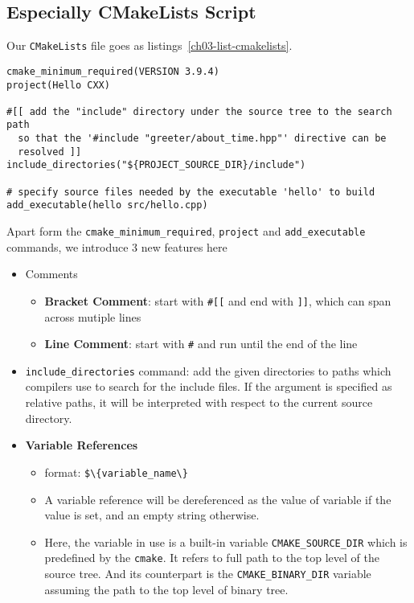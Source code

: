 \documentclass[a4paper,10pt]{book}
\newcommand{\mkeyword}[1]{{\color{magenta} \lstinline!#1!}}
\begin{document}
\subsection{Especially CMakeLists Script}
Our \texttt{CMakeLists} file goes as listings~\ref{ch03-list-cmakelists}.\par
\begin{lstlisting}[caption={Codes for \texttt{CMakeLists.txt}},label=ch03-list-cmakelists]
cmake_minimum_required(VERSION 3.9.4)
project(Hello CXX)

#[[ add the "include" directory under the source tree to the search path
  so that the '#include "greeter/about_time.hpp"' directive can be
  resolved ]]
include_directories("${PROJECT_SOURCE_DIR}/include")

# specify source files needed by the executable 'hello' to build
add_executable(hello src/hello.cpp)
\end{lstlisting}
Apart form the \mkeyword{cmake_minimum_required}, \mkeyword{project} and \mkeyword{add_executable} commands, we introduce 3 new features here
\begin{itemize}
	\item Comments
    \begin{itemize}
      \item \textbf{Bracket Comment}: start with \mkeyword{#[[} and end with \mkeyword{]]}, which can span across mutiple lines
      \item \textbf{Line Comment}: start with \mkeyword{#} and run until the end of the line
    \end{itemize}
  \item \mkeyword{include_directories} command: add the given directories to paths which compilers use to search for the include files. If the argument is specified as relative paths, it will be interpreted with respect to the current source directory.
  \item \textbf{Variable References}
    \begin{itemize}
      \item format: \mkeyword{$\{variable_name\}}
      \item A variable reference will be dereferenced as the value of variable if the value is set, and an empty string otherwise.
      \item Here, the variable in use is a built-in variable \mkeyword{CMAKE_SOURCE_DIR} which is predefined by the \mkeyword{cmake}. It refers to full path to the top level of the source tree. And its counterpart is the \mkeyword{CMAKE_BINARY_DIR} variable assuming the path to the top level of binary tree.  
    \end{itemize}
\end{itemize}
\end{document}
